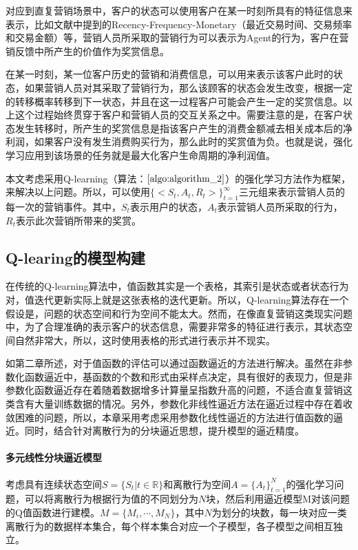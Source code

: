 对应到直复营销场景中，客户的状态可以使用客户在某一时刻所具有的特征信息来表示，比如文献\citep{tkachenko2015autonomous}中提到的Recency-Frequency-Monetary（最近交易时间、交易频率和交易金额）等，营销人员所采取的营销行为可以表示为Agent的行为，客户在营销反馈中所产生的价值作为奖赏信息。

在某一时刻，某一位客户历史的营销和消费信息，可以用来表示该客户此时的状态，如果营销人员对其采取了营销行为，那么该顾客的状态会发生改变，根据一定的转移概率转移到下一状态，并且在这一过程客户可能会产生一定的奖赏信息。以上这个过程始终贯穿于客户和营销人员的交互关系之中。需要注意的是，在客户状态发生转移时，所产生的奖赏信息是指该客户产生的消费金额减去相关成本后的净利润，如果客户没有发生消费购买行为，那么此时的奖赏值为负。也就是说，强化学习应用到该场景的任务就是最大化客户生命周期的净利润值。

本文考虑采用Q-learning（算法：$\ref{algo:algorithm_2}$）的强化学习方法作为框架，来解决以上问题。所以，可以使用$\{<S_{t},A_{t},R_{t}>\}_{t=1}^{\infty}$三元组来表示营销人员的每一次的营销事件。其中，$S_{t}$表示用户的状态，$A_{t}$表示营销人员所采取的行为，$R_{t}$表示此次营销所带来的奖赏。

\subsection{Q-learing的模型构建}
在传统的Q-learning算法中，值函数其实是一个表格，其索引是状态或者状态行为对，值迭代更新实际上就是这张表格的迭代更新。所以，Q-learning算法存在一个假设是，问题的状态空间和行为空间不能太大。然而，在像直复营销这类现实问题中，为了合理准确的表示客户的状态信息，需要非常多的特征进行表示，其状态空间自然非常大，所以，这时使用表格的形式进行表示并不现实。

如第二章所述，对于值函数的评估可以通过函数逼近的方法进行解决。虽然在非参数化函数逼近中，基函数的个数和形式由采样点决定，具有很好的表现力，但是非参数化函数逼近存在着随着数据增多计算量呈指数升高的问题，不适合直复营销这类含有大量训练数据的情况。另外，参数化非线性逼近方法在逼近过程中存在着收敛困难的问题，所以，本章采用考虑采用参数化线性逼近的方法进行值函数的逼近。同时，结合针对离散行为的分块逼近思想，提升模型的逼近精度。

\paragraph{多元线性分块逼近模型}
考虑具有连续状态空间$S=\{S_{t}|t\in \mathbb{R}\}$和离散行为空间$A=\{A_{t}\}_{t=1}^{N}$的强化学习问题，可以将离散行为根据行为值的不同划分为$N$块，然后利用逼近模型M对该问题的Q值函数进行建模。$M=\{M_{i},\cdots,M_{N}\}$，其中$N$为划分的块数，每一块对应一类离散行为的数据样本集合，每个样本集合对应一个子模型，各子模型之间相互独立。

